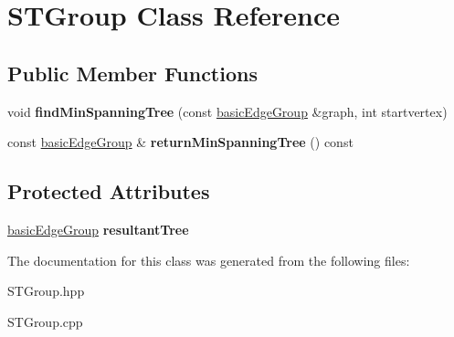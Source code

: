 \hypertarget{classSTGroup}{
\section{STGroup Class Reference}
\label{classSTGroup}
}
\subsection*{Public Member Functions}
\begin{DoxyCompactItemize}
\item 
\hypertarget{classSTGroup_a8b85e0564a09020a702f30e1bf56f02c}{
void {\bfseries findMinSpanningTree} (const \hyperlink{classbasicEdgeGroup}{basicEdgeGroup} \&graph, int startvertex)}
\label{classSTGroup_a8b85e0564a09020a702f30e1bf56f02c}

\item 
\hypertarget{classSTGroup_a15dc86e65e3b100ec0c541650a266379}{
const \hyperlink{classbasicEdgeGroup}{basicEdgeGroup} \& {\bfseries returnMinSpanningTree} () const }
\label{classSTGroup_a15dc86e65e3b100ec0c541650a266379}

\end{DoxyCompactItemize}
\subsection*{Protected Attributes}
\begin{DoxyCompactItemize}
\item 
\hypertarget{classSTGroup_a2b1fc9bd64f7eb611485b1d46ac1b6ce}{
\hyperlink{classbasicEdgeGroup}{basicEdgeGroup} {\bfseries resultantTree}}
\label{classSTGroup_a2b1fc9bd64f7eb611485b1d46ac1b6ce}

\end{DoxyCompactItemize}


The documentation for this class was generated from the following files:\begin{DoxyCompactItemize}
\item 
STGroup.hpp\item 
STGroup.cpp\end{DoxyCompactItemize}
